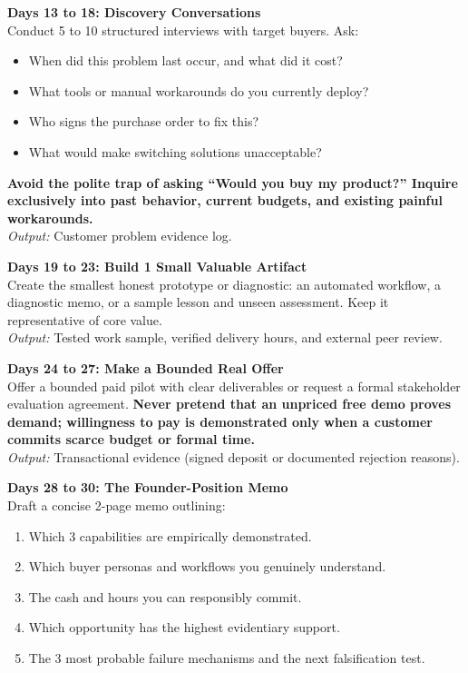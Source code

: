 \textbf{Days 13 to 18: Discovery Conversations} \\
Conduct 5 to 10 structured interviews with target buyers. Ask:
\begin{itemize}[leftmargin=11pt,itemsep=1pt,topsep=1pt,parsep=0pt]
  \item When did this problem last occur, and what did it cost?
  \item What tools or manual workarounds do you currently deploy?
  \item Who signs the purchase order to fix this?
  \item What would make switching solutions unacceptable?
\end{itemize}
\textbf{Avoid the polite trap of asking ``Would you buy my product?'' Inquire exclusively into past behavior, current budgets, and existing painful workarounds.} \\
\textit{Output:} Customer problem evidence log.

\textbf{Days 19 to 23: Build 1 Small Valuable Artifact} \\
Create the smallest honest prototype or diagnostic: an automated workflow, a diagnostic memo, or a sample lesson and unseen assessment. Keep it representative of core value. \\
\textit{Output:} Tested work sample, verified delivery hours, and external peer review.

\textbf{Days 24 to 27: Make a Bounded Real Offer} \\
Offer a bounded paid pilot with clear deliverables or request a formal stakeholder evaluation agreement. \textbf{Never pretend that an unpriced free demo proves demand; willingness to pay is demonstrated only when a customer commits scarce budget or formal time.} \\
\textit{Output:} Transactional evidence (signed deposit or documented rejection reasons).

\textbf{Days 28 to 30: The Founder-Position Memo} \\
Draft a concise 2-page memo outlining:
\begin{enumerate}[label=\textbf{\arabic*.},leftmargin=11pt,itemsep=1pt,topsep=1pt,parsep=0pt]
  \item Which 3 capabilities are empirically demonstrated.
  \item Which buyer personas and workflows you genuinely understand.
  \item The cash and hours you can responsibly commit.
  \item Which opportunity has the highest evidentiary support.
  \item The 3 most probable failure mechanisms and the next falsification test.
\end{enumerate}
